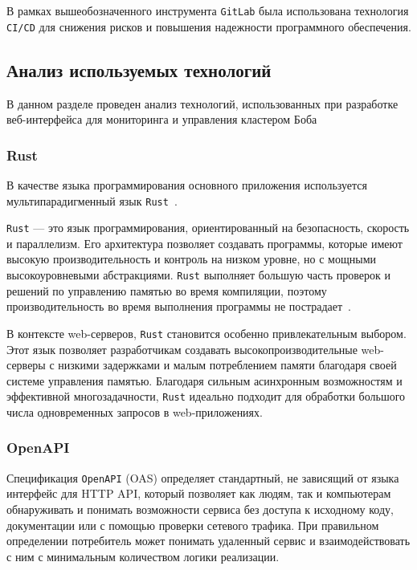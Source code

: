 В рамках вышеобозначенного инструмента \texttt{GitLab} была использована технология \texttt{CI/CD}\cite{cowell2023automating} для снижения рисков и повышения надежности программного обеспечения.

\subsection{Анализ используемых технологий}

В данном разделе проведен анализ технологий, использованных при разработке веб-интерфейса для мониторинга и управления кластером Боба

\subsubsection{Rust}

В качестве языка программирования основного приложения используется мультипарадигменный язык \texttt{Rust}~\cite{rust}. 

\texttt{Rust} --- это язык программирования, ориентированный на безопасность, скорость и параллелизм.
Его архитектура позволяет создавать программы, которые имеют высокую производительность и контроль на низком уровне, но с мощными высокоуровневыми абстракциями.
\texttt{Rust} выполняет большую часть проверок и решений по управлению памятью во время компиляции, поэтому производительность во время выполнения программы не пострадает~\cite{rustbook}.

В контексте web-серверов, \texttt{Rust} становится особенно привлекательным выбором.
Этот язык позволяет разработчикам создавать высокопроизводительные web-серверы с низкими задержками и малым потреблением памяти благодаря своей системе управления памятью. 
Благодаря сильным асинхронным возможностям и эффективной многозадачности, \texttt{Rust} идеально подходит для обработки большого числа одновременных запросов в web-приложениях.

\subsubsection{OpenAPI}

Спецификация \texttt{OpenAPI} (OAS) определяет стандартный, не зависящий от языка интерфейс для HTTP API, который позволяет как людям, так и компьютерам обнаруживать и понимать возможности сервиса без доступа к исходному коду, документации или с помощью проверки сетевого трафика. 
При правильном определении потребитель может понимать удаленный сервис и взаимодействовать с ним с минимальным количеством логики реализации.

